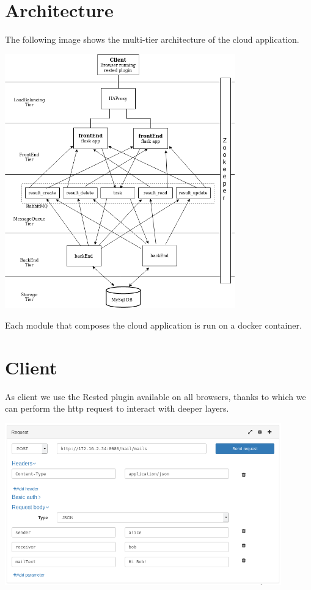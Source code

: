 \documentclass{article}
\begin{document}
\section{Architecture}
The following image shows the multi-tier architecture of the cloud application.
\begin{minipage}{\linewidth}
\begin{center}
\vspace{8mm}
\includegraphics[height=11cm]{./img/architecture.png} 
\vspace{9mm}
\end{center}
\end{minipage}
Each module that composes the cloud application is run on a docker container.




\section{Client}
As client we use the Rested plugin available on all browsers, thanks to which we can perform the http request to interact with deeper layers.\\
\begin{minipage}{\linewidth}
\begin{center}
\vspace{8mm}
\includegraphics[height=7cm]{./img/rested.png} 
\vspace{8mm}
\end{center}
\end{minipage}
\end{document}
